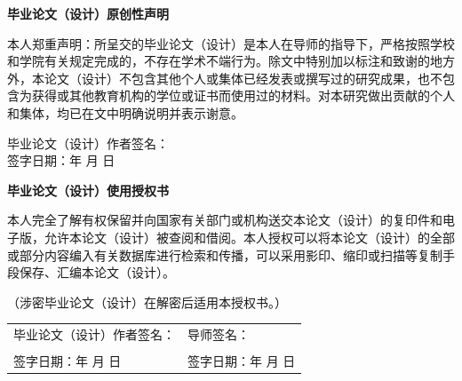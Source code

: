 \begin{center}
    \bfseries {} 毕业论文（设计）原创性声明
\end{center}

{
    \setlength{\parindent}{2em}

    \par 本人郑重声明：所呈交的毕业论文（设计）是本人在导师的指导下，严格按照学校和学院有关规定完成的，不存在学术不端行为。除文中特别加以标注和致谢的地方外，本论文（设计）不包含其他个人或集体已经发表或撰写过的研究成果，也不包含为获得或其他教育机构的学位或证书而使用过的材料。对本研究做出贡献的个人和集体，均已在文中明确说明并表示谢意。

    \begin{flushright}
        毕业论文（设计）作者签名：\hspace*{32mm} \\
        \vspace{3mm}
        签字日期：\quad 年 \quad 月 \quad 日
    \end{flushright}

    \vspace{10mm}

    \begin{center}
        \bfseries {} 毕业论文（设计）使用授权书
    \end{center}

    \par 本人完全了解有权保留并向国家有关部门或机构送交本论文（设计）的复印件和电子版，允许本论文（设计）被查阅和借阅。本人授权可以将本论文（设计）的全部或部分内容编入有关数据库进行检索和传播，可以采用影印、缩印或扫描等复制手段保存、汇编本论文（设计）。

    \par （涉密毕业论文（设计）在解密后适用本授权书。）

    \vspace{12mm}

    \begin{center}
        \begin{tabularx}{\linewidth}{>{\fangsong}X>{\fangsong}X}
            毕业论文（设计）作者签名：\hspace*{10mm} &
            导师签名： \\
            \vspace{3mm} & \vspace{3mm} \\
            签字日期：\quad 年 \quad 月 \quad 日 &
            签字日期：\quad 年 \quad 月 \quad 日
        \end{tabularx}
    \end{center}
}
